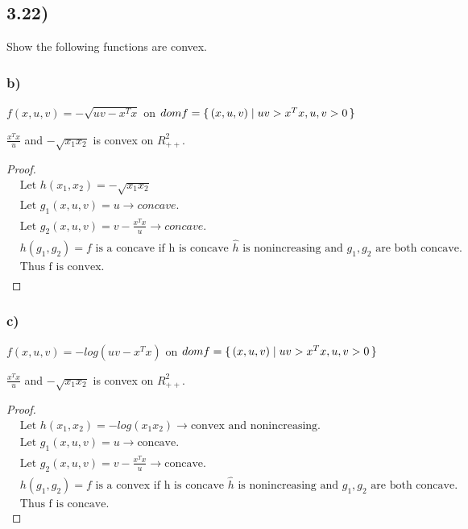 \documentclass[12pt]{article}
\newenvironment{proposition}[2][Proposition]{\begin{trivlist}
\item[\hskip \labelsep {\bfseries #1}\hskip \labelsep {\bfseries #2.}]}{\end{trivlist}}
\begin{document}
\subsection*{3.22)}
Show the following functions are convex.

\subsubsection*{b)}
$f(x,u,v) = - \sqrt{uv - x^Tx}$ on $dom f = \set{(x,u,v) | uv > x^Tx, u,v >0}$

\begin{proposition}{}
$\frac{x^Tx}{u}$ and $-\sqrt{x_1x_2}$ is convex on $R_{++}^{2}$.
\end{proposition}

\begin{proof}
\begin{align*}
& \text{Let } h(x_1,x_2) = -\sqrt{x_1x_2}\\
& \text{Let } g_1(x, u, v) = u \rightarrow concave.\\
& \text{Let } g_2(x, u, v) = v - \frac{x^Tx}{u} \rightarrow concave.\\
& \text{$h(g_1,g_2) = f$ is a concave if h is concave $\hat{h}$ is nonincreasing and $g_1,g_2$ are both concave.}\\
& \text{Thus f is convex.}\\
\end{align*}
\end{proof}

\subsubsection*{c)}
$f(x,u,v) = -log(uv - x^Tx)$ on $dom f = \set{(x,u,v) | uv > x^Tx, u,v >0}$

\begin{proposition}{}
$\frac{x^Tx}{u}$ and $-\sqrt{x_1x_2}$ is convex on $R_{++}^{2}$.
\end{proposition}
\begin{proof}
\begin{align*}
& \text{Let } h(x_1,x_2) = -log(x_1x_2) \rightarrow \text{convex and nonincreasing.}\\
& \text{Let } g_1(x, u, v) = u \rightarrow \text{concave.}\\
& \text{Let } g_2(x, u, v) = v - \frac{x^Tx}{u} \rightarrow \text{concave.}\\
& \text{$h(g_1,g_2) = f$ is a convex if h is concave $\hat{h}$ is nonincreasing and $g_1,g_2$ are both concave.}\\
& \text{Thus f is concave.}
\end{align*}
\end{proof}
\end{document}
